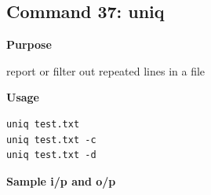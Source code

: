 \subsection{Command 37: uniq} 
\textbf{Purpose}
\begin{flushleft}
 report or filter out repeated lines in a file
\end{flushleft}
\textbf{Usage}
\begin{verbatim}
uniq test.txt
uniq test.txt -c
uniq test.txt -d
\end{verbatim}
\textbf{Sample i/p and o/p}
\begin{figure}[H] 
\end{figure}
